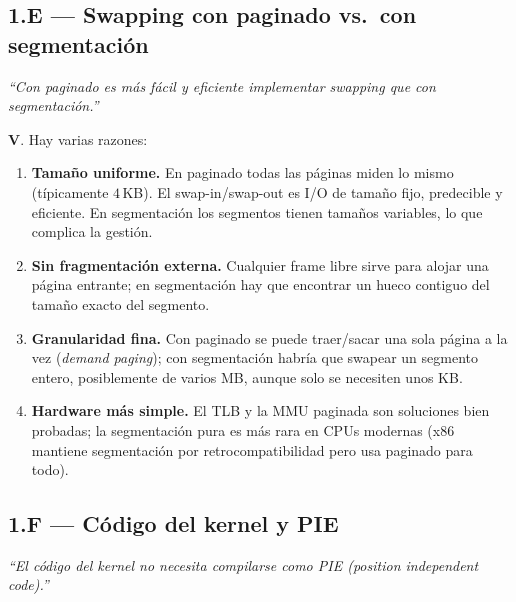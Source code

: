 \documentclass[11pt,a4paper]{article}
\begin{document}
\subsection*{1.E --- Swapping con paginado vs.\ con segmentación}

\emph{``Con paginado es más fácil y eficiente implementar swapping
que con segmentación.''}

\begin{respuesta}
\textbf{V}. Hay varias razones:

\begin{enumerate}[leftmargin=*,nosep]
    \item \textbf{Tamaño uniforme.} En paginado todas las páginas
        miden lo mismo (típicamente $4$\,KB). El swap-in/swap-out es
        I/O de tamaño fijo, predecible y eficiente. En segmentación
        los segmentos tienen tamaños variables, lo que complica la
        gestión.
    \item \textbf{Sin fragmentación externa.} Cualquier frame libre
        sirve para alojar una página entrante; en segmentación hay
        que encontrar un hueco contiguo del tamaño exacto del
        segmento.
    \item \textbf{Granularidad fina.} Con paginado se puede traer/sacar
        una sola página a la vez (\emph{demand paging}); con
        segmentación habría que swapear un segmento entero, posiblemente
        de varios MB, aunque solo se necesiten unos KB.
    \item \textbf{Hardware más simple.} El TLB y la MMU paginada son
        soluciones bien probadas; la segmentación pura es más rara
        en CPUs modernas (x86 mantiene segmentación por
        retrocompatibilidad pero usa paginado para todo).
\end{enumerate}
\end{respuesta}

\subsection*{1.F --- Código del kernel y PIE}

\emph{``El código del kernel no necesita compilarse como PIE
(\emph{position independent code}).''}
\end{document}
